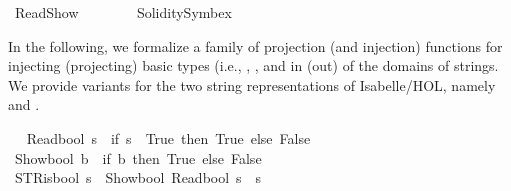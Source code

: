 %
\begin{isabellebody}%
%
%
\isadelimdocument
%
\endisadelimdocument
%
\isatagdocument
%
\isamarkuptrue%
%
\endisatagdocument
{\isafolddocument}%
%
\isadelimdocument
%
\endisadelimdocument
%
\isadelimtheory
%
\endisadelimtheory
%
\isatagtheory
{}\isamarkupfalse%
\ ReadShow\isanewline
\ \ \ \isanewline
\ \ \ \ Solidity{\isacharunderscore}{\kern0pt}Symbex\ \isanewline
{}%
\endisatagtheory
{\isafoldtheory}%
%
\isadelimtheory
%
\endisadelimtheory
%
\begin{isamarkuptext}%
In the following, we formalize a family of projection (and injection) functions for injecting 
  (projecting) basic types (i.e., , , and  in (out) of the 
  domains of strings. We provide variants for the two string representations of Isabelle/HOL, namely
   and .%
\end{isamarkuptext}\isamarkuptrue%
%
\isadelimdocument
%
\endisadelimdocument
%
\isatagdocument
%
\isamarkuptrue%
%
\endisatagdocument
{\isafolddocument}%
%
\isadelimdocument
%
\endisadelimdocument
{}\isamarkupfalse%
\ \isanewline
\ {\isacartoucheopen}Read\isactrlsub b\isactrlsub o\isactrlsub o\isactrlsub l\ s\ {\isacharequal}{\kern0pt}\ {\isacharparenleft}{\kern0pt}if\ s\ {\isacharequal}{\kern0pt}\ {\isacharprime}{\kern0pt}{\isacharprime}{\kern0pt}True{\isacharprime}{\kern0pt}{\isacharprime}{\kern0pt}\ then\ True\ else\ False{\isacharparenright}{\kern0pt}{\isacartoucheclose}\isanewline
{}\isamarkupfalse%
\isanewline
\ {\isacartoucheopen}Show\isactrlsub b\isactrlsub o\isactrlsub o\isactrlsub l\ b\ {\isacharequal}{\kern0pt}\ {\isacharparenleft}{\kern0pt}if\ b\ then\ {\isacharprime}{\kern0pt}{\isacharprime}{\kern0pt}True{\isacharprime}{\kern0pt}{\isacharprime}{\kern0pt}\ else\ {\isacharprime}{\kern0pt}{\isacharprime}{\kern0pt}False{\isacharprime}{\kern0pt}{\isacharprime}{\kern0pt}{\isacharparenright}{\kern0pt}{\isacartoucheclose}\isanewline
{}\isamarkupfalse%
\ \isanewline
\ {\isacartoucheopen}STR{\isacharunderscore}{\kern0pt}is{\isacharunderscore}{\kern0pt}bool\ s\ {\isacharequal}{\kern0pt}\ {\isacharparenleft}{\kern0pt}Show\isactrlsub b\isactrlsub o\isactrlsub o\isactrlsub l\ {\isacharparenleft}{\kern0pt}Read\isactrlsub b\isactrlsub o\isactrlsub o\isactrlsub l\ s{\isacharparenright}{\kern0pt}\ {\isacharequal}{\kern0pt}\ s{\isacharparenright}{\kern0pt}{\isacartoucheclose}\isanewline

\end{isabellebody}
